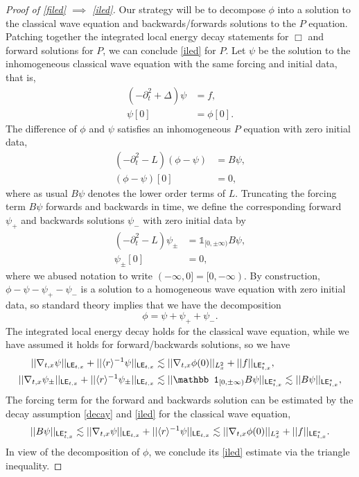 \begin{proof}[Proof of \eqref{filed} $\implies$ \eqref{iled}]
	Our strategy will be to decompose $\phi$ into a solution to the classical wave equation and backwards/forwards solutions to the $P$ equation. Patching together the integrated local energy decay statements for $\Box$ and forward solutions for $P$, we can conclude \eqref{iled} for $P$. Let $\psi$ be the solution to the inhomogeneous classical wave equation with the same forcing and initial data, that is, 
		\begin{align*}
			(-\partial_t^2 + \Delta) \psi
				&= f, \\
			\psi[0]
				&= \phi[0].
		\end{align*}
	The difference of $\phi$ and $\psi$ satisfies an inhomogeneous $P$ equation with zero initial data, 
		\begin{align*}
			(-\partial_t^2 - L) (\phi - \psi)
				&= B\psi, \\
			(\phi - \psi)[0]
				&= 0,
		\end{align*}
	where as usual $B\psi$ denotes the lower order terms of $L$. Truncating the forcing term $B\psi$ forwards and backwards in time, we define the corresponding forward $\psi_+$ and backwards solutions $\psi_-$ with zero initial data by 
		\begin{align*}
			(-\partial_t^2 - L) \psi_\pm
				&= \mathbb 1_{[0, \pm \infty)} B \psi,\\
			\psi_\pm [0]	
				&= 0,
		\end{align*}
	where we abused notation to write $(-\infty, 0] = [0, -\infty)$. By construction, $\phi - \psi - \psi_+ - \psi_-$ is a solution to a homogeneous wave equation with zero initial data, so standard theory implies that we have the decomposition 
		\[
			\phi = \psi + \psi_+ + \psi_-. 
		\]
	The integrated local energy decay holds for the classical wave equation, while we have assumed it holds for forward/backwards solutions, so we have
		\begin{align*}
			||\nabla_{t, x} \psi||_{\LE_{t, x}} + ||\langle r \rangle^{-1} \psi||_{\LE_{t, x}} 
				&\lesssim ||\nabla_{t, x} \phi(0)||_{L^2_x} + ||f||_{\LE^*_{t, x}},\\
			||\nabla_{t, x} \psi_\pm||_{\LE_{t, x}} + ||\langle r \rangle^{-1} \psi_\pm||_{\LE_{t, x}} 
				&\lesssim ||\mathbb 1_{[0, \pm \infty)} B\psi||_{\LE^*_{t, x}} \lesssim || B\psi||_{\LE^*_{t, x}},
		\end{align*}
	The forcing term for the forward and backwards solution can be estimated by the decay assumption \eqref{decay} and \eqref{iled} for the classical wave equation,
		\[
			||B\psi||_{\mathsf{LE}^*_{t, x}} \lesssim ||\nabla_{t, x} \psi||_{\mathsf{LE}_{t, x}} + ||\langle r \rangle^{-1} \psi||_{\mathsf{LE}_{t, x}} \lesssim ||\nabla_{t, x} \phi (0)||_{L^2_x} + || f||_{\mathsf{LE}^*_{t, x}}.
		\]
	In view of the decomposition of $\phi$, we conclude its \eqref{iled} estimate via the triangle inequality. 	
\end{proof}

